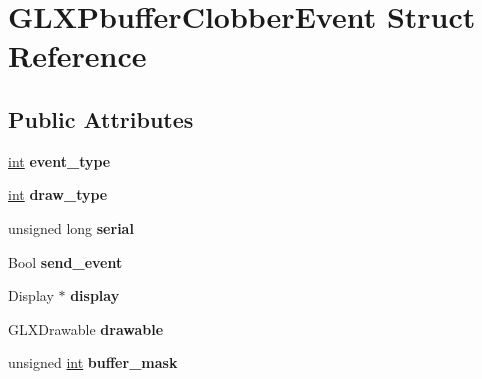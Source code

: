 \hypertarget{struct_g_l_x_pbuffer_clobber_event}{}\section{G\+L\+X\+Pbuffer\+Clobber\+Event Struct Reference}
\label{struct_g_l_x_pbuffer_clobber_event}
\subsection*{Public Attributes}
\begin{DoxyCompactItemize}
\item 
\hypertarget{struct_g_l_x_pbuffer_clobber_event_a30d7162d8d77246b01f5e610cda4da68}{}\hyperlink{_s_d_l__thread_8h_a6a64f9be4433e4de6e2f2f548cf3c08e}{int} {\bfseries event\+\_\+type}\label{struct_g_l_x_pbuffer_clobber_event_a30d7162d8d77246b01f5e610cda4da68}

\item 
\hypertarget{struct_g_l_x_pbuffer_clobber_event_a243f92b79d3cfbde73eab02815be2320}{}\hyperlink{_s_d_l__thread_8h_a6a64f9be4433e4de6e2f2f548cf3c08e}{int} {\bfseries draw\+\_\+type}\label{struct_g_l_x_pbuffer_clobber_event_a243f92b79d3cfbde73eab02815be2320}

\item 
\hypertarget{struct_g_l_x_pbuffer_clobber_event_a6390b2875ae06a4cb827d2b4c321eda3}{}unsigned long {\bfseries serial}\label{struct_g_l_x_pbuffer_clobber_event_a6390b2875ae06a4cb827d2b4c321eda3}

\item 
\hypertarget{struct_g_l_x_pbuffer_clobber_event_aa51969e67e4ad6095bda26ca64fe8ba6}{}Bool {\bfseries send\+\_\+event}\label{struct_g_l_x_pbuffer_clobber_event_aa51969e67e4ad6095bda26ca64fe8ba6}

\item 
\hypertarget{struct_g_l_x_pbuffer_clobber_event_aeb49bb93cc59448e75d66170a39596d1}{}Display $\ast$ {\bfseries display}\label{struct_g_l_x_pbuffer_clobber_event_aeb49bb93cc59448e75d66170a39596d1}

\item 
\hypertarget{struct_g_l_x_pbuffer_clobber_event_a388908b766e35205c1a461ea8b60439f}{}G\+L\+X\+Drawable {\bfseries drawable}\label{struct_g_l_x_pbuffer_clobber_event_a388908b766e35205c1a461ea8b60439f}

\item 
\hypertarget{struct_g_l_x_pbuffer_clobber_event_aff4c23d00f6dad98427f8d32a5f10580}{}unsigned \hyperlink{_s_d_l__thread_8h_a6a64f9be4433e4de6e2f2f548cf3c08e}{int} {\bfseries buffer\+\_\+mask}\label{struct_g_l_x_pbuffer_clobber_event_aff4c23d00f6dad98427f8d32a5f10580}


\end{DoxyCompactItemize}

